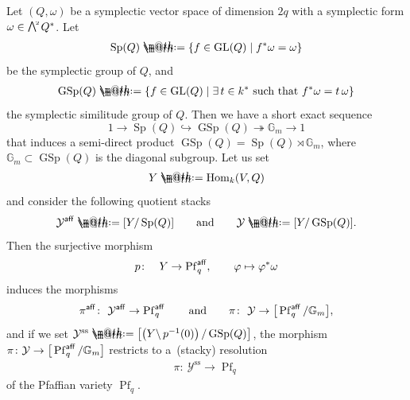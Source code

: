 \documentclass[10pt,a4paper]{amsart}
\makeatletter
\newcommand*{\defeq}{\mathrel{\rlap{%
 \raisebox{0.3ex}{$\m@th\cdot$}}%
 \raisebox{-0.3ex}{$\m@th\cdot$}}%
 =}
\numberwithin{equation}{section}
\newcommand{\Hom}{\operatorname{Hom}}
\newcommand{\Pf}{\operatorname{Pf}}
\newcommand{\Sp}{\operatorname{Sp}}
\newcommand{\GL}{\operatorname{GL}}
\newcommand{\GSp}{\operatorname{GSp}}
\newcommand{\aff}{\operatorname{\sf aff}}
\newcommand{\stab}{\operatorname{ss}}
\newcommand{\cY}{\mathcal{Y}}
\newcommand{\bG}{\mathbb{G}}
\newcommand{\hookto}{\hookrightarrow}
\newcommand{\surjto}{\twoheadrightarrow}
\newcommand{\gwedge}{\raisebox{1pt}[0pt][0pt]{$\textstyle \bigwedge^{\raisebox{-1pt}[0pt][0pt]{\tiny\!$2$\,}}$}}
\makeatother
\begin{document}
 Let $(Q,\omega)$ be a symplectic vector space of dimension $2q$ with a symplectic form $\omega\in \gwedge Q^{\ast}$. Let
\begin{gather*}
\Sp(Q)\defeq\{f\in \GL(Q)\mid f^*\omega=\omega\}
\end{gather*}
be the symplectic group of $Q$, and
\begin{gather*}
\GSp(Q)\defeq\{f\in \GL(Q)\mid \exists\, t\in k^*\mbox{ such that } f^*\omega=t\, \omega\}
\end{gather*}
the symplectic similitude group of $Q$.
Then we have a short exact sequence
\begin{equation}\label{ses}
1\to\Sp(Q)\hookto \GSp(Q)\surjto \bG_m\to1
\end{equation}
that induces a semi-direct product $\GSp(Q)= \Sp(Q)\rtimes\bG_m$, where $\bG_m\subset \GSp(Q)$ is the diagonal subgroup. Let us set
\begin{gather*}
Y\defeq\Hom_k(V,Q)
\end{gather*}
and consider the following quotient stacks
\begin{gather*}
\cY^{\aff}\defeq[Y/\Sp(Q)]
\qquad\text{and}\qquad
\cY\defeq[Y/\GSp(Q)].
\end{gather*}
Then the surjective morphism
\begin{gather*}
p\colon\quad Y\to \Pf_q^{\aff}, \qquad \varphi\mapsto \varphi^*\omega
\end{gather*}
induces the morphisms
\begin{gather*}
\pi^{\aff}\colon\ \cY^{\aff}\to \Pf_q^{\aff}
\qquad\text{and}\qquad
\pi\colon\ \cY\to \big[\Pf_q^{\aff}/\bG_m\big],
\end{gather*}
and if we set $\cY^{\stab}\defeq\left[\left(Y\backslash \,p^{-1}(0)\right)/\GSp(Q)\right]$, the morphism $\pi\colon \cY\to \big[\Pf_q^{\aff}/\bG_m\big]$ restricts to a~(stacky) resolution
\begin{gather*}
\pi\colon\ \cY^{\stab}\to \Pf_q
\end{gather*}
of the Pfaffian variety $\Pf_q$.
\end{document}
